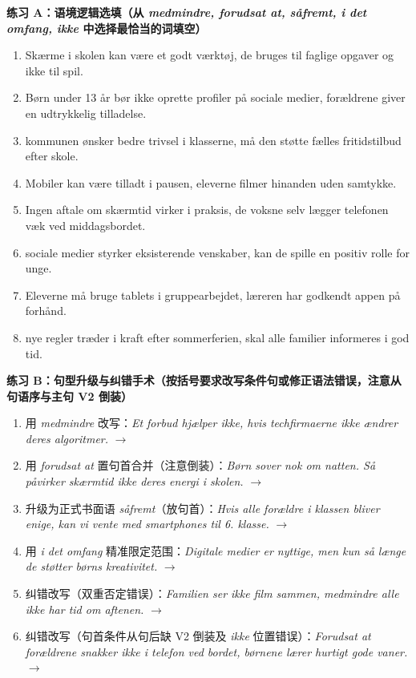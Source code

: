 \textbf{练习 A：语境逻辑选填（从 \textit{medmindre, forudsat at, såfremt, i det omfang, ikke} 中选择最恰当的词填空）}
\begin{enumerate}
  \item Skærme i skolen kan være et godt værktøj, \underline{\hspace{2.2cm}} de bruges til faglige opgaver og ikke til spil.
  \item Børn under 13 år bør ikke oprette profiler på sociale medier, \underline{\hspace{2.2cm}} forældrene giver en udtrykkelig tilladelse.
  \item \underline{\hspace{2.2cm}} kommunen ønsker bedre trivsel i klasserne, må den støtte fælles fritidstilbud efter skole.
  \item Mobiler kan være tilladt i pausen, \underline{\hspace{2.2cm}} eleverne \underline{\hspace{2.2cm}} filmer hinanden uden samtykke.
  \item Ingen aftale om skærmtid virker i praksis, \underline{\hspace{2.2cm}} de voksne selv lægger telefonen væk ved middagsbordet.
  \item \underline{\hspace{2.2cm}} sociale medier styrker eksisterende venskaber, kan de spille en positiv rolle for unge.
  \item Eleverne må bruge tablets i gruppearbejdet, \underline{\hspace{2.2cm}} læreren har godkendt appen på forhånd.
  \item \underline{\hspace{2.2cm}} nye regler træder i kraft efter sommerferien, skal alle familier informeres i god tid.
\end{enumerate}

\textbf{练习 B：句型升级与纠错手术（按括号要求改写条件句或修正语法错误，注意从句语序与主句 V2 倒装）}
\begin{enumerate}
  \item 用 \textit{medmindre} 改写：\textit{Et forbud hjælper ikke, hvis techfirmaerne ikke ændrer deres algoritmer.} $\rightarrow$
  \item 用 \textit{forudsat at} 置句首合并（注意倒装）：\textit{Børn sover nok om natten. Så påvirker skærmtid ikke deres energi i skolen.} $\rightarrow$
  \item 升级为正式书面语 \textit{såfremt}（放句首）：\textit{Hvis alle forældre i klassen bliver enige, kan vi vente med smartphones til 6. klasse.} $\rightarrow$
  \item 用 \textit{i det omfang} 精准限定范围：\textit{Digitale medier er nyttige, men kun så længe de støtter børns kreativitet.} $\rightarrow$
  \item 纠错改写（双重否定错误）：\textit{Familien ser ikke film sammen, medmindre alle ikke har tid om aftenen.} $\rightarrow$
  \item 纠错改写（句首条件从句后缺 V2 倒装及 \textit{ikke} 位置错误）：\textit{Forudsat at forældrene snakker ikke i telefon ved bordet, børnene lærer hurtigt gode vaner.} $\rightarrow$
\end{enumerate}

